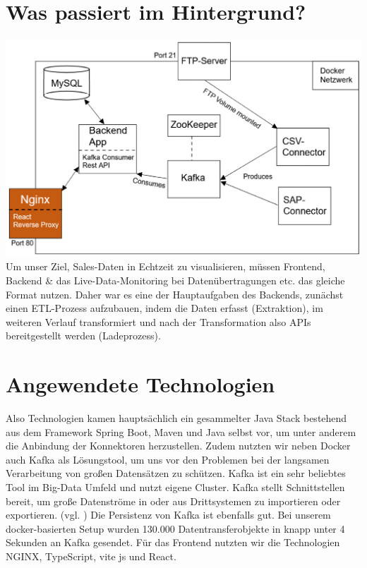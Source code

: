 \section*{Was passiert im Hintergrund?}
\includegraphics[width=\linewidth]{src/abbildungen/Architektur.png}
\newline
{}
\newline
Um unser Ziel, Sales-Daten in Echtzeit zu visualisieren, müssen Frontend, Backend & das Live-Data-Monitoring bei Datenübertragungen etc. das gleiche Format nutzen. Daher war es eine der Hauptaufgaben des Backends, zunächst einen ETL-Prozess aufzubauen, indem die Daten erfasst (Extraktion), im weiteren Verlauf transformiert und nach der Transformation also APIs bereitgestellt werden (Ladeprozess).
\newline


\section*{Angewendete Technologien}
Also Technologien kamen hauptsächlich ein gesammelter Java Stack bestehend aus dem Framework Spring Boot, Maven und Java selbst vor, um unter anderem die Anbindung der Konnektoren herzustellen.
\newline
\newline
Zudem nutzten wir neben Docker auch Kafka als Lösungstool, um uns vor den Problemen bei der langsamen Verarbeitung von großen Datensätzen zu schützen. Kafka ist ein sehr beliebtes Tool im Big-Data Umfeld und nutzt eigene Cluster. Kafka stellt Schnittstellen bereit, um große Datenströme in oder aus Drittsystemen zu importieren oder exportieren. (vgl. \cite{kafka2018})
\newline
\newline
Die Persistenz von Kafka ist ebenfalls gut. Bei unserem docker-basierten Setup wurden 130.000 Datentransferobjekte in knapp unter 4 Sekunden an Kafka gesendet.
\newline
Für das Frontend nutzten wir die Technologien NGINX, TypeScript, vite js und React.
